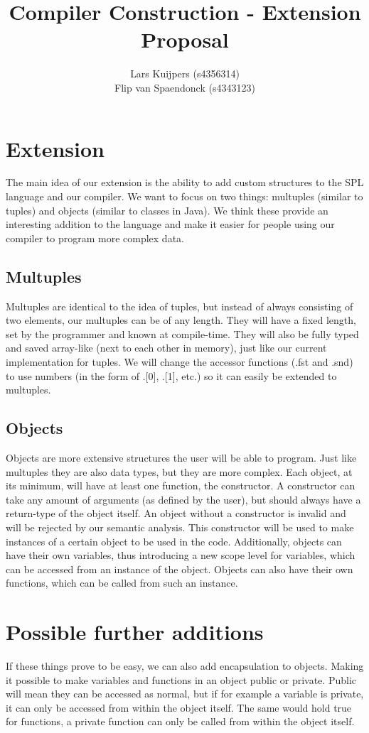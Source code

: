 \documentclass[10pt,a4paper]{article}
\title{Compiler Construction - Extension Proposal}
\author{Lars Kuijpers (s4356314) \\ Flip van Spaendonck (s4343123)}
\date{}
\begin{document}
\maketitle

\section{Extension}
The main idea of our extension is the ability to add custom structures to the SPL language and our compiler. We want to focus on two things: multuples (similar to tuples) and objects (similar to classes in Java). We think these provide an interesting addition to the language and make it easier for people using our compiler to program more complex data.

\subsection{Multuples}
Multuples are identical to the idea of tuples, but instead of always consisting of two elements, our multuples can be of any length. They will have a fixed length, set by the programmer and known at compile-time. They will also be fully typed and saved array-like (next to each other in memory), just like our current implementation for tuples. We will change the accessor functions (.fst and .snd) to use numbers (in the form of .[0], .[1], etc.) so it can easily be extended to multuples.

\subsection{Objects}
Objects are more extensive structures the user will be able to program. Just like multuples they are also data types, but they are more complex. Each object, at its minimum, will have at least one function, the constructor. A constructor can take any amount of arguments (as defined by the user), but should always have a return-type of the object itself. An object without a constructor is invalid and will be rejected by our semantic analysis. This constructor will be used to make instances of a certain object to be used in the code. Additionally, objects can have their own variables, thus introducing a new scope level for variables, which can be accessed from an instance of the object. Objects can also have their own functions, which can be called from such an instance. 

\section{Possible further additions}
If these things prove to be easy, we can also add encapsulation to objects. Making it possible to make variables and functions in an object public or private. Public will mean they can be accessed as normal, but if for example a variable is private, it can only be accessed from within the object itself. The same would hold true for functions, a private function can only be called from within the object itself.
\end{document}

